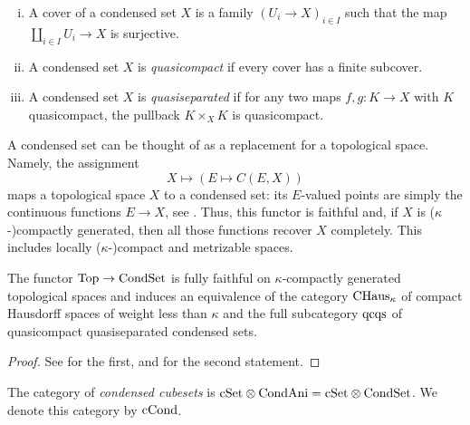 \begin{definition}\label{def:cond-qcqs}
\begin{enumerate}[(i)]
    \item A cover of a condensed set $X$ is a family $(U_i\to X)_{i\in I}$ such that the map $\coprod_{i\in I}U_i\to X$ is surjective.
    \item A condensed set $X$ is \emph{quasicompact} if every cover has a finite subcover.
    \item A condensed set $X$ is \emph{quasiseparated} if for any two maps $f,g\colon K\to X$ with $K$ quasicompact,
            the pullback $K\times_X K$ is quasicompact.
\end{enumerate}
\end{definition}

A condensed set can be thought of as a replacement for a topological space.
Namely, the assignment
\[
    X \mapsto (E\mapsto C(E,X))
\]
maps a topological space $X$ to a condensed set: its $E$-valued points are simply the continuous functions $E\to X$,
see \cite[Section 2.4]{Bihlmaier2025}.
Thus, this functor is faithful and, if $X$ is ($\kappa$-)compactly generated, then all those functions recover $X$ completely.
This includes locally ($\kappa$-)compact and metrizable spaces.

\begin{proposition}\label{prop:cond-top-compactly-gen}
The functor $\mathrm{Top}\to\mathrm{CondSet}$ is fully faithful on $\kappa$-compactly generated topological spaces
and induces an equivalence of the category $\mathrm{CHaus}_\kappa$ of compact Hausdorff spaces of weight less than $\kappa$
and the full subcategory $\mathrm{qcqs}$ of quasicompact quasiseparated condensed sets.
\end{proposition}

\begin{proof}
See \cite[Corollary 2.3.29]{Bihlmaier2025} for the first, and \cite[Theorem 2.5.46]{Bihlmaier2025} for the second statement.
\end{proof}

\begin{definition}\label{def:cond-cube}
The category of \emph{condensed cubesets} is $\mathrm{cSet}\otimes\mathrm{CondAni} = \mathrm{cSet}\otimes\mathrm{CondSet}$.
We denote this category by $\mathrm{cCond}$.
\end{definition}

